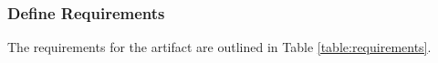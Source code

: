 %
%
%



\subsubsection*{Define Requirements}

The requirements for the artifact are outlined in Table \ref{table:requirements}.

